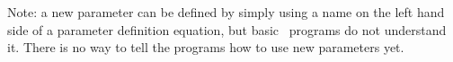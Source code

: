 \vspace*{14pt}

Note: a new parameter can be defined by simply using a name on the left
hand side of a parameter definition equation, but basic \mweb\
programs do not understand it. There is no way to tell the programs
how to use new parameters yet.


